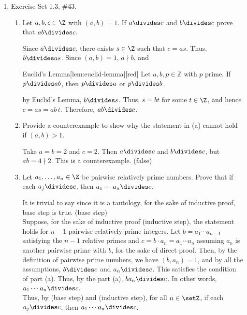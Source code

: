 \begin{enumerate}
  \item Exercise Set 1.3, \#43.
  \begin{enumerate}
    \item Let $a,b,c \in \Z$ with $(a,b)=1$. If $a \divides c$ and $b\divides c$ prove that $ab\divides c$.
    \begin{subprove}
      Since $a\divides c$, there exists $s\in\Z$ such that $c=a s$. Thus, $b\divides as$. Since $(a,b)=1$, $a \nmid b$, and
      \begin{define}{Euclid's Lemma}[lem:euclid-lemma][red]
      Let $a,b,p\in\mathds{Z}$ with $p$ prime. If $p\divides ab$, then $p\divides a$ or $p\divides b$.
      \end{define}
      by Euclid's Lemma, $b\divides s$. Thus, $s=bt$ for some $t\in\Z$, and hence $c=as=ab\,t$. Therefore, $ab\divides c$.
    \end{subprove}
    \item Provide a counterexample to show why the statement in (a) cannot hold if $(a,b)>1$.
    \begin{subanswer}
      Take $a=b=2$ and $c=2$. Then $a\divides c$ and $b\divides c$, but $ab=4\nmid 2$. 
      This is a counterexample. (false)
    \end{subanswer}
    \item Let $a_1, \ldots, a_n \in \Z$ be pairwise relatively prime numbers. Prove that if each $a_j \divides c$, then $a_1 \cdots a_n \divides c$.
    \begin{subprove}
      It is trivial to say  since it is a 
      tautology, for the sake of inductive proof, base step is true. (base step)\vspace*{10px}\\
      Suppose, for the sake of inductive proof (inductive step), the statement holds for $n-1$ 
      pairwise relatively prime integers.
      Let $b=a_1\cdots a_{n-1}$ satisfying the $n-1$ relative primes and $c=b\cdot a_n = a_1\cdots a_{n}$ assuming $a_n$ is another 
      pairwise prime with $b$, for the sake of direct proof. 
      Then, by the definition of pairwise prime numbers, we have $(b,a_n)=1$, and by all the 
      assumptions, $b\divides c$ and $a_n\divides c$. This satisfies the condition of part (a). 
      Thus, by the part (a), $b a_n\divides c$. In other words, $a_1\cdots a_{n}\divides c$.\vspace*{10px}\\
      Thus, by (base step) and (inductive step), for all $n\in\setZ$, if each $a_j \divides c$, then $a_1 \cdots a_n \divides c$.
    \end{subprove}
  \end{enumerate}


\end{enumerate}

